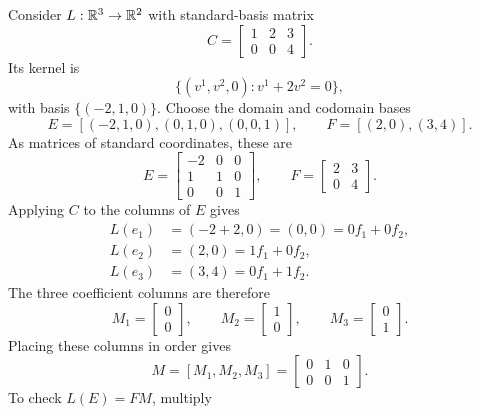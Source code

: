 \begin{example}
  \label{ex:linear-algebra-i:adapted-basis-matrix}
  Consider \(L:\mathbb{R}^3\to\mathbb{R}^2\) with standard-basis matrix
  \[
    C=\begin{bmatrix}1&2&3\\0&0&4\end{bmatrix}.
  \]
  Its kernel is
  \[
    \{(v^1,v^2,0):v^1+2v^2=0\},
  \]
  with basis \(\{(-2,1,0)\}\). Choose the domain and codomain bases
  \[
    E=[(-2,1,0),(0,1,0),(0,0,1)],
    \qquad F=[(2,0),(3,4)].
  \]
  As matrices of standard coordinates, these are
  \[
    E=\begin{bmatrix}-2&0&0\\1&1&0\\0&0&1\end{bmatrix},
    \qquad F=\begin{bmatrix}2&3\\0&4\end{bmatrix}.
  \]
  Applying \(C\) to the columns of \(E\) gives
  \[
    \begin{aligned}
      L(e_1)&=(-2+2,0)=(0,0)=0f_1+0f_2,\\
      L(e_2)&=(2,0)=1f_1+0f_2,\\
      L(e_3)&=(3,4)=0f_1+1f_2.
    \end{aligned}
  \]
  The three coefficient columns are therefore
  \[
    M_1=\begin{bmatrix}0\\0\end{bmatrix},\qquad
    M_2=\begin{bmatrix}1\\0\end{bmatrix},\qquad
    M_3=\begin{bmatrix}0\\1\end{bmatrix}.
  \]
  Placing these columns in order gives
  \[
    M=[M_1,M_2,M_3]=\begin{bmatrix}0&1&0\\0&0&1\end{bmatrix}.
  \]
  To check \(L(E)=FM\), multiply
  \[
    \begin{aligned}

\end{aligned}\]
\end{example}
